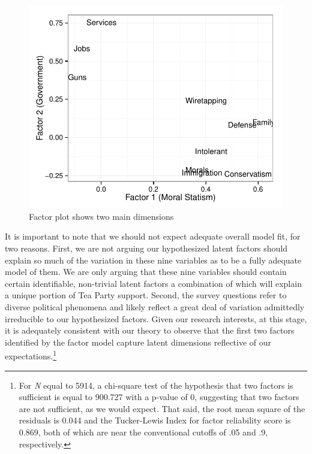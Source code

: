 \documentclass[12pt,]{article}
\begin{document}
\begin{figure}[htbp]
\centering
\includegraphics{figures/factorplot-1.pdf}
\caption{Factor plot shows two main dimensions}
\end{figure}

It is important to note that we should not expect adequate overall model
fit, for two reasons. First, we are not arguing our hypothesized latent
factors should explain so much of the variation in these nine variables
as to be a fully adequate model of them. We are only arguing that these
nine variables should contain certain identifiable, non-trivial latent
factors a combination of which will explain a unique portion of Tea
Party support. Second, the survey questions refer to diverse political
phenomena and likely reflect a great deal of variation admittedly
irreducible to our hypothesized factors. Given our research interests,
at this stage, it is adequately consistent with our theory to observe
that the first two factors identified by the factor model capture latent
dimensions reflective of our expectations.\footnote{For \emph{N} equal
  to 5914, a chi-square test of the hypothesis that two factors is
  sufficient is equal to 900.727 with a p-value of 0, suggesting that
  two factors are not sufficient, as we would expect. That said, the
  root mean square of the residuals is 0.044 and the Tucker-Lewis Index
  for factor reliability score is 0.869, both of which are near the
  conventional cutoffs of .05 and .9, respectively.}
\end{document}

